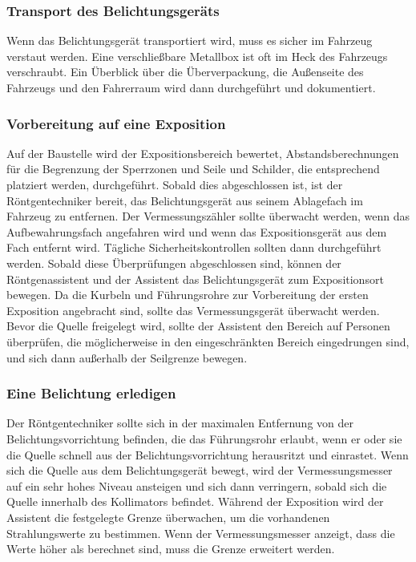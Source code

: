 {\subsubsection{Transport des Belichtungsgeräts}
Wenn das Belichtungsgerät transportiert wird, muss es sicher im Fahrzeug verstaut werden. Eine verschließbare Metallbox ist oft im Heck des Fahrzeugs verschraubt. Ein Überblick über die Überverpackung, die Außenseite des Fahrzeugs und den Fahrerraum wird dann durchgeführt und dokumentiert.
\subsubsection{Vorbereitung auf eine Exposition}
Auf der Baustelle wird der Expositionsbereich bewertet, Abstandsberechnungen für die Begrenzung der Sperrzonen und Seile und Schilder, die entsprechend platziert werden, durchgeführt. Sobald dies abgeschlossen ist, ist der Röntgentechniker bereit, das Belichtungsgerät aus seinem Ablagefach im Fahrzeug zu entfernen. Der Vermessungszähler sollte überwacht werden, wenn das Aufbewahrungsfach angefahren wird und wenn das Expositionsgerät aus dem Fach entfernt wird. Tägliche Sicherheitskontrollen sollten dann durchgeführt werden. Sobald diese Überprüfungen abgeschlossen sind, können der Röntgenassistent und der Assistent das Belichtungsgerät zum Expositionsort bewegen. Da die Kurbeln und Führungsrohre zur Vorbereitung der ersten Exposition angebracht sind, sollte das Vermessungsgerät überwacht werden. Bevor die Quelle freigelegt wird, sollte der Assistent den Bereich auf Personen überprüfen, die möglicherweise in den eingeschränkten Bereich eingedrungen sind, und sich dann außerhalb der Seilgrenze bewegen.
\subsubsection{Eine Belichtung erledigen}

Der Röntgentechniker sollte sich in der maximalen Entfernung von der Belichtungsvorrichtung befinden, die das Führungsrohr erlaubt, wenn er oder sie die Quelle schnell aus der Belichtungsvorrichtung herausritzt und einrastet. Wenn sich die Quelle aus dem Belichtungsgerät bewegt, wird der Vermessungsmesser auf ein sehr hohes Niveau ansteigen und sich dann verringern, sobald sich die Quelle innerhalb des Kollimators befindet. Während der Exposition wird der Assistent die festgelegte Grenze überwachen, um die vorhandenen Strahlungswerte zu bestimmen. Wenn der Vermessungsmesser anzeigt, dass die Werte höher als berechnet sind, muss die Grenze erweitert werden.
}
